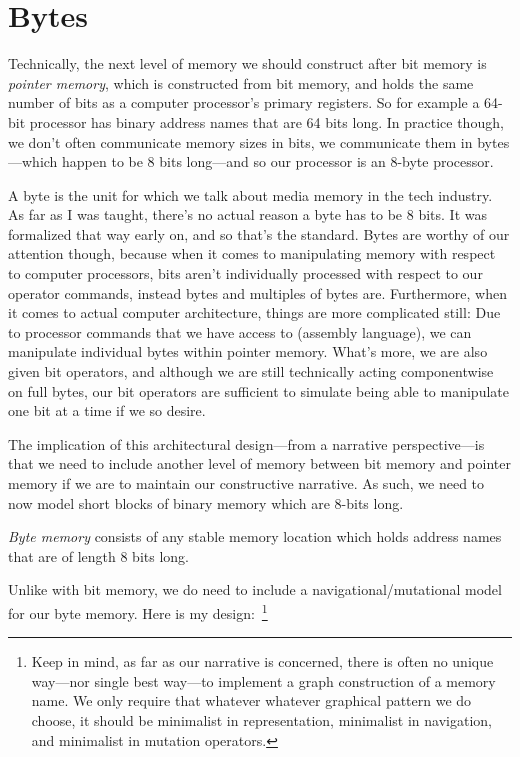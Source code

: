 \documentclass[twoside]{article}
\newenvironment{definition}[1][Definition]{\begin{trivlist}
\item[\hskip \labelsep {\bfseries #1:}]}{\end{trivlist}}
\begin{document}
\section*{Bytes}

Technically, the next level of memory we should construct after bit memory is \emph{pointer memory}, which is constructed
from bit memory, and holds the same number of bits as a computer processor's primary registers. So for example a 64-bit
processor has binary address names that are 64 bits long. In practice though, we don't often communicate memory sizes in bits,
we communicate them in bytes---which happen to be 8 bits long---and so our processor is an 8-byte processor.

A byte is the unit for which we talk about media memory in the tech industry. As far as I was taught, there's no actual
reason a byte has to be 8 bits. It was formalized that way early on, and so that's the standard. Bytes are worthy of our
attention though, because when it comes to manipulating memory with respect to computer processors, bits aren't individually
processed with respect to our operator commands, instead bytes and multiples of bytes are. Furthermore, when it comes to actual
computer architecture, things are more complicated still: Due to processor commands that we have access to (assembly language),
we can manipulate individual bytes within pointer memory. What's more, we are also given bit operators, and although we are still
technically acting componentwise on full bytes, our bit operators are sufficient to simulate being able to manipulate one bit
at a time if we so desire.

The implication of this architectural design---from a narrative perspective---is that we need to include another level of memory
between bit memory and pointer memory if we are to maintain our constructive narrative. As such, we need to now model short blocks
of binary memory which are 8-bits long.

\begin{definition}[Byte Memory]
\emph{Byte memory} consists of any stable memory location which holds address names that are of length 8 bits long.
\end{definition}

Unlike with bit memory, we do need to include a navigational/mutational model for our byte memory. Here is my design:~\footnote{Keep
in mind, as far as our narrative is concerned, there is often no unique way---nor single best way---to implement a graph construction
of a memory name. We only require that whatever whatever graphical pattern we do choose, it should be minimalist in representation,
minimalist in navigation, and minimalist in mutation operators.}
\end{document}
